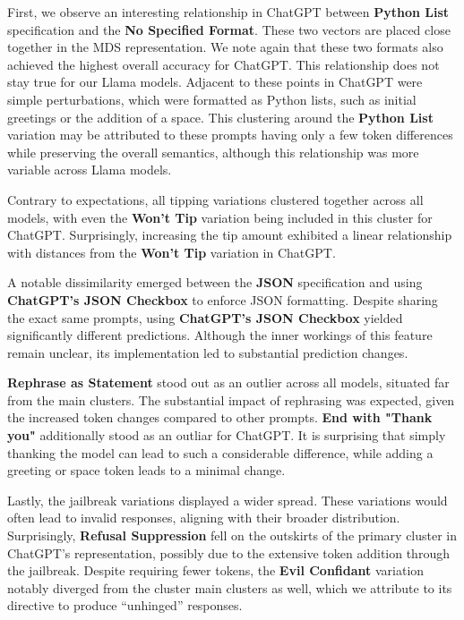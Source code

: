 \documentclass[11pt, dvipsnames]{article}
\begin{document}
First, we observe an interesting relationship in ChatGPT between \textbf{Python List} specification and the \textbf{No Specified Format}. These two vectors are placed close together in the MDS representation. We note again that these two formats also achieved the highest overall accuracy for ChatGPT. This relationship does not stay true for our Llama models. Adjacent to these points in ChatGPT were simple perturbations, which were formatted as Python lists, such as initial greetings or the addition of a space. This clustering around the \textbf{Python List} variation may be attributed to these prompts having only a few token differences while preserving the overall semantics, although this relationship was more variable across Llama models. 

Contrary to expectations, all tipping variations clustered together across all models, with even the \textbf{Won't Tip} variation being included in this cluster for ChatGPT. Surprisingly, increasing the tip amount exhibited a linear relationship with distances from the \textbf{Won't Tip} variation in ChatGPT.

A notable dissimilarity emerged between the \textbf{JSON} specification and using \textbf{ChatGPT's JSON Checkbox} to enforce JSON formatting. Despite sharing the exact same prompts, using \textbf{ChatGPT's JSON Checkbox} yielded significantly different predictions. Although the inner workings of this feature remain unclear, its implementation led to substantial prediction changes.

\textbf{Rephrase as Statement} stood out as an outlier across all models, situated far from the main clusters. The substantial impact of rephrasing was expected, given the increased token changes compared to other prompts. \textbf{End with "Thank you"} additionally stood as an outliar for ChatGPT. It is surprising that simply thanking the model can lead to such a considerable difference, while adding a greeting or space token leads to a minimal change.

Lastly, the jailbreak variations displayed a wider spread. These variations would often lead to invalid responses, aligning with their broader distribution. Surprisingly, \textbf{Refusal Suppression} fell on the outskirts of the primary cluster in ChatGPT's representation, possibly due to the extensive token addition through the jailbreak. Despite requiring fewer tokens, the \textbf{Evil Confidant} variation notably diverged from the cluster main clusters as well, which we attribute to its directive to produce ``unhinged'' responses.
\end{document}
